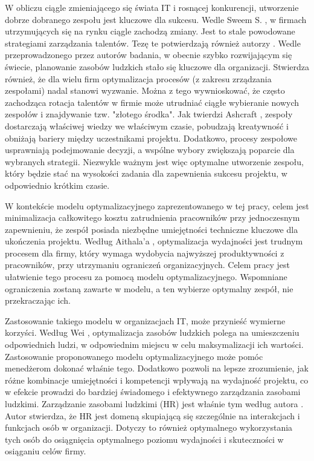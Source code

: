\par W obliczu ciągle zmieniającego się świata IT i rosnącej konkurencji, utworzenie dobrze dobranego zespołu jest kluczowe dla sukcesu. Wedle Sweem S. \parencite{sweem2009leveraging}, w firmach utrzymujących się na rynku ciągle zachodzą zmiany. Jest to stale powodowane strategiami zarządzania talentów. Tezę te potwierdzają również autorzy \parencite{rusilowati2024optimizing}. Wedle przeprowadzonego przez autorów badania, w obecnie szybko rozwijającym się świecie, planowanie zasobów ludzkich stało się kluczowe dla organizacji. Stwierdza również, że dla wielu firm optymalizacja procesów (z zakresu zrządzania zespołami) nadal stanowi wyzwanie. Można z tego wywnioskować, że często zachodząca rotacja talentów w firmie może utrudniać ciągłe wybieranie nowych zespołów i znajdywanie tzw. "złotego środka". Jak twierdzi Ashcraft \parencite{ashcraft2011ipd}, zespoły dostarczają właściwej wiedzy we właściwym czasie, pobudzają kreatywność i obniżają bariery między uczestnikami projektu. Dodatkowo, procesy zespołowe usprawniają podejmowanie decyzji, a wspólne wybory zwiększają poparcie dla wybranych strategii. Niezwykle ważnym jest więc optymalne utworzenie zespołu, który będzie stać na wysokości zadania dla zapewnienia sukcesu projektu, w odpowiednio krótkim czasie.

\par W kontekście modelu optymalizacyjnego zaprezentowanego w tej pracy, celem jest minimalizacja całkowitego kosztu zatrudnienia pracowników przy jednoczesnym zapewnieniu, że zespół posiada niezbędne umiejętności techniczne kluczowe dla ukończenia projektu. Według Aithala'a \parencite{aithal2016theory}, optymalizacja wydajności jest trudnym procesem dla firmy, który wymaga wydobycia najwyższej produktywności z pracowników, przy utrzymaniu ograniczeń organizacyjnych. Celem pracy jest ułatwienie tego procesu za pomocą modelu optymalizacyjnego. Wspomniane ograniczenia zostaną zawarte w modelu, a ten wybierze optymalny zespół, nie przekraczając ich.

\par Zastosowanie takiego modelu w organizacjach IT, może przynieść wymierne korzyści. Według Wei \parencite{wei2022optimal}, optymalizacja zasobów ludzkich polega na umieszczeniu odpowiednich ludzi, w odpowiednim miejscu w celu maksymalizacji ich wartości. Zastosowanie proponowanego modelu optymalizacyjnego może pomóc menedżerom dokonać właśnie tego. Dodatkowo pozwoli na lepsze zrozumienie, jak różne kombinacje umiejętności i kompetencji wpływają na wydajność projektu, co w efekcie prowadzi do bardziej świadomego i efektywnego zarządzania zasobami ludzkimi. Zarządzanie zasobami ludzkimi (HR) jest właśnie tym według autora \parencite{albi2024innovative}. Autor stwierdza, że HR jest domeną skupiającą się szczególnie na interakcjach i funkcjach osób w organizacji. Dotyczy to również optymalnego wykorzystania tych osób do osiągnięcia optymalnego poziomu wydajności i skuteczności w osiąganiu celów firmy. 

